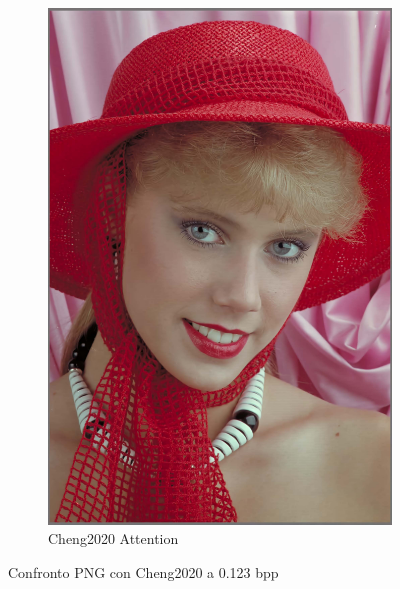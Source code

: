 \begin{figure}[t!]
\begin{subfigure}[]{0.25\textwidth}
        \includegraphics[width=\textwidth]{Immagini/IMAGES/cheng2020-anchor_3_IMG0004.pdf}
        \caption{Cheng2020 Attention}
        \label{fig:CompressedCheng2020Attention}
    \end{subfigure}
    \caption{Confronto PNG con Cheng2020 a 0.123 bpp}
    \label{fig:CompressionCheng2020}
\end{figure}